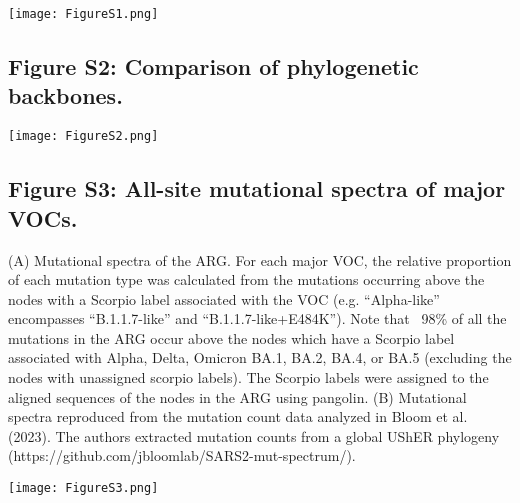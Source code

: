 \documentclass[12pt,letterpaper]{article}
\begin{document}
\noindent\texttt{[image: FigureS1.png]}

\subsection*{Figure S2: Comparison of phylogenetic backbones.}

\noindent\texttt{[image: FigureS2.png]}

\subsection*{Figure S3: All-site mutational spectra of major VOCs.}
(A) Mutational spectra of the ARG. 
For each major VOC, the relative proportion of each mutation type was calculated from 
the mutations occurring above the nodes with a Scorpio label associated with the VOC 
(e.g. “Alpha-like” encompasses “B.1.1.7-like” and “B.1.1.7-like+E484K”). 
Note that ~98\% of all the mutations in the ARG occur above the nodes 
which have a Scorpio label associated with Alpha, Delta, Omicron BA.1, BA.2, BA.4, or BA.5 
(excluding the nodes with unassigned scorpio labels). 
The Scorpio labels were assigned to the aligned sequences of the nodes in the ARG using pangolin. 
(B) Mutational spectra reproduced from the mutation count data analyzed in Bloom et al. (2023). 
The authors extracted mutation counts from a global UShER phylogeny (https://github.com/jbloomlab/SARS2-mut-spectrum/).

\noindent\texttt{[image: FigureS3.png]}
\end{document}
